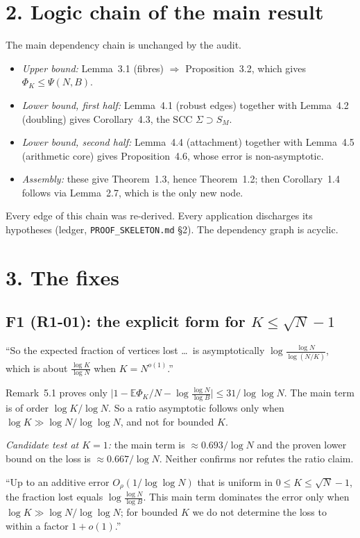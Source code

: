 \documentclass[10pt]{article}
\newcommand{\E}{\mathbb{E}}
\begin{document}
\section*{2. Logic chain of the main result}

\begin{insight}
The main dependency chain is unchanged by the audit.
\begin{itemize}\itemsep0pt
\item \emph{Upper bound:} Lemma~3.1 (fibres) $\Rightarrow$ Proposition~3.2, which gives $\Phi_K\le\Psi(N,B)$.
\item \emph{Lower bound, first half:} Lemma~4.1 (robust edges) together with Lemma~4.2 (doubling) gives Corollary~4.3, the SCC $\Sigma\supset S_M$.
\item \emph{Lower bound, second half:} Lemma~4.4 (attachment) together with Lemma~4.5 (arithmetic core) gives Proposition~4.6, whose error is non-asymptotic.
\item \emph{Assembly:} these give Theorem~1.3, hence Theorem~1.2; then Corollary~1.4 follows via Lemma~2.7, which is the only new node.
\end{itemize}
Every edge of this chain was re-derived. Every application discharges its hypotheses (ledger, \texttt{PROOF\_\allowbreak{}SKELETON.md} \S2). The dependency graph is acyclic.
\end{insight}

\section*{3. The fixes}

\subsection*{F1 (R1-01): the explicit form for $K\le\sqrt N-1$}
\begin{before}
``So the expected fraction of vertices lost \ldots\ is asymptotically $\log\frac{\log N}{\log(N/K)}$, which is about $\frac{\log K}{\log N}$ when $K=N^{o(1)}$.''
\end{before}
\begin{whywrong}
Remark~5.1 proves only $\bigl|1-\E\Phi_K/N-\log\frac{\log N}{\log B}\bigr|\le 31/\log\log N$. The main term is of order $\log K/\log N$. So a ratio asymptotic follows only when $\log K\gg\log N/\log\log N$, and not for bounded $K$.

\emph{Candidate test at $K=1$:} the main term is $\approx0.693/\log N$ and the proven lower bound on the loss is $\approx0.667/\log N$. Neither confirms nor refutes the ratio claim.
\end{whywrong}
\begin{after}
``Up to an additive error $O_\rho(1/\log\log N)$ that is uniform in $0\le K\le\sqrt N-1$, the fraction lost equals $\log\frac{\log N}{\log B}$. This main term dominates the error only when $\log K\gg\log N/\log\log N$; for bounded $K$ we do not determine the loss to within a factor $1+o(1)$.''
\end{after}
\end{document}
